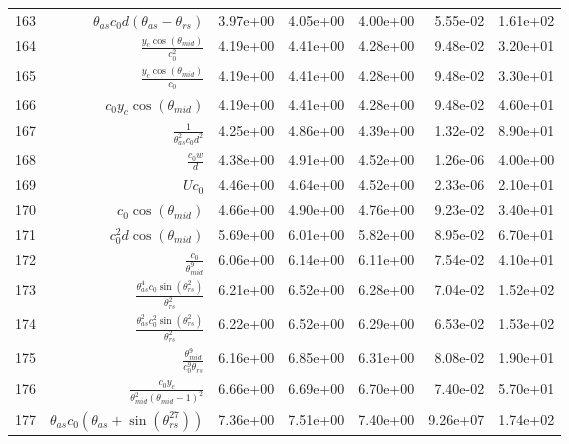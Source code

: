 \begin{tabularx}{\textwidth}{lRRRRRl}
163  &  $ \theta_{as} c_{0} d \left(\theta_{as} - \theta_{rs}\right) $  &  3.97e+00  &  4.05e+00  &  4.00e+00  &  5.55e-02  &  1.61e+02  \\ 
164  &  $ \displaystyle\frac{y_c \cos{\left(\theta_{mid} \right)}}{c_{0}^{2}} $  &  4.19e+00  &  4.41e+00  &  4.28e+00  &  9.48e-02  &  3.20e+01  \\ 
165  &  $ \displaystyle\frac{y_c \cos{\left(\theta_{mid} \right)}}{c_{0}} $  &  4.19e+00  &  4.41e+00  &  4.28e+00  &  9.48e-02  &  3.30e+01  \\ 
166  &  $ c_{0} y_c \cos{\left(\theta_{mid} \right)} $  &  4.19e+00  &  4.41e+00  &  4.28e+00  &  9.48e-02  &  4.60e+01  \\ 
167  &  $ \displaystyle\frac{1}{\theta_{as}^{2} c_{0} d^{2}} $  &  4.25e+00  &  4.86e+00  &  4.39e+00  &  1.32e-02  &  8.90e+01  \\ 
168  &  $ \displaystyle\frac{c_{0} w}{d} $  &  4.38e+00  &  4.91e+00  &  4.52e+00  &  1.26e-06  &  4.00e+00  \\ 
169  &  $ U c_{0} $  &  4.46e+00  &  4.64e+00  &  4.52e+00  &  2.33e-06  &  2.10e+01  \\ 
170  &  $ c_{0} \cos{\left(\theta_{mid} \right)} $  &  4.66e+00  &  4.90e+00  &  4.76e+00  &  9.23e-02  &  3.40e+01  \\ 
171  &  $ c_{0}^{2} d \cos{\left(\theta_{mid} \right)} $  &  5.69e+00  &  6.01e+00  &  5.82e+00  &  8.95e-02  &  6.70e+01  \\ 
172  &  $ \displaystyle\frac{c_{0}}{\theta_{mid}^{9}} $  &  6.06e+00  &  6.14e+00  &  6.11e+00  &  7.54e-02  &  4.10e+01  \\ 
173  &  $ \displaystyle\frac{\theta_{as}^{4} c_{0} \sin{\left(\theta_{rs}^{2} \right)}}{\theta_{rs}^{2}} $  &  6.21e+00  &  6.52e+00  &  6.28e+00  &  7.04e-02  &  1.52e+02  \\ 
174  &  $ \displaystyle\frac{\theta_{as}^{2} c_{0}^{2} \sin{\left(\theta_{rs}^{2} \right)}}{\theta_{rs}^{2}} $  &  6.22e+00  &  6.52e+00  &  6.29e+00  &  6.53e-02  &  1.53e+02  \\ 
175  &  $ \displaystyle\frac{\theta_{mid}^{9}}{c_{0}^{9} \theta_{rs}} $  &  6.16e+00  &  6.85e+00  &  6.31e+00  &  8.08e-02  &  1.90e+01  \\ 
176  &  $ \displaystyle\frac{c_{0} y_c}{\theta_{mid}^{2} \left(\theta_{mid} - 1\right)^{2}} $  &  6.66e+00  &  6.69e+00  &  6.70e+00  &  7.40e-02  &  5.70e+01  \\ 
177  &  $ \theta_{as} c_{0} \left(\theta_{as} + \sin{\left(\theta_{rs}^{27} \right)}\right) $  &  7.36e+00  &  7.51e+00  &  7.40e+00  &  9.26e+07  &  1.74e+02  \\ 

\end{tabularx}
